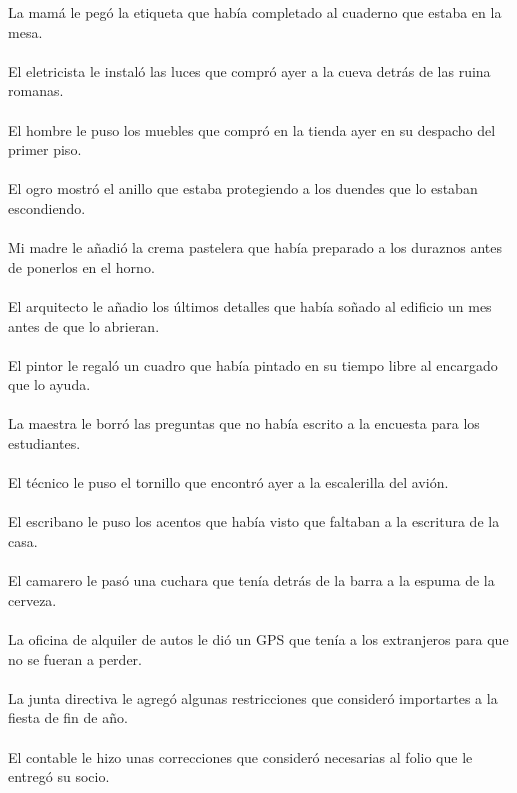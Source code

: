 La mam\'{a} le peg\'{o} la etiqueta que hab\'{i}a completado al cuaderno que estaba en la mesa.	\\	\\
El eletricista le instal\'{o} las luces que compr\'{o} ayer a la cueva detr\'{a}s de las ruina romanas.	\\	\\
El hombre le puso los muebles que compr\'{o} en la tienda ayer en su despacho del primer piso.	\\	\\
El ogro mostr\'{o} el anillo que estaba protegiendo a los duendes que lo estaban escondiendo.	\\	\\
Mi madre le a\~{n}adi\'{o} la crema pastelera que hab\'{i}a preparado a los duraznos antes de ponerlos en el horno.	\\	\\
El arquitecto le a\~{n}adio los \'{u}ltimos detalles que hab\'{i}a so\~{n}ado al edificio un mes antes de que lo abrieran.	\\	\\
El pintor le regal\'{o} un cuadro que hab\'{i}a pintado en su tiempo libre al encargado que lo ayuda.	\\	\\
La maestra le borr\'{o} las preguntas que no hab\'{i}a escrito a la encuesta para los estudiantes.	\\	\\
El t\'{e}cnico le puso el tornillo que encontr\'{o} ayer a la escalerilla del avi\'{o}n.	\\	\\
El escribano le puso los acentos que hab\'{i}a visto que faltaban a la escritura de la casa.	\\	\\
El camarero le pas\'{o} una cuchara que ten\'{i}a detr\'{a}s de la barra a la espuma de la cerveza.	\\	\\
La oficina de alquiler de autos le di\'{o} un GPS que ten\'{i}a a los extranjeros para que no se fueran a perder.	\\	\\
La junta directiva le agreg\'{o} algunas restricciones que consider\'{o} importartes a la fiesta de fin de a\~{n}o.	\\	\\
El contable le hizo unas correcciones que consider\'{o} necesarias al folio que le entreg\'{o} su socio.	\\	\\
